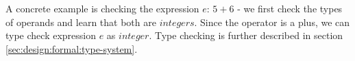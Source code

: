 \newblock
\par
A concrete example is checking the expression $\textit{e}$: $5 + 6$ - we first check the types of operands and learn that both are $\textit{integers}$. Since the operator is a plus, we can type check expression $e$ as $integer$. Type checking is further described in section \cref{sec:design:formal:type-system}.

